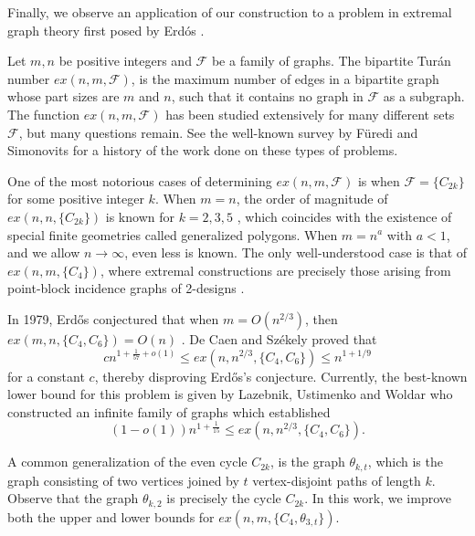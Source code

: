 \documentclass[12pt]{article}
\begin{document}
Finally, we observe an application of our construction to a problem in extremal graph theory first posed by Erd\'{o}s \cite{Erdos1979}.

Let $m, n$ be positive integers and $\mathcal{F}$ be a family of graphs. The bipartite Tur\'{a}n number $ex(n, m, \mathcal{F})$, is the maximum number of edges in a bipartite graph whose part sizes are $m$ and $n$, such that it contains no graph in $\mathcal{F}$ as a subgraph. The function $ex(n, m, \mathcal{F})$ has been studied extensively for many different sets $\mathcal{F}$, but many questions remain. See the well-known survey by F\"{u}redi and Simonovits \cite{FurediSimonovits2013} for a history of the work done on these types of problems.

One of the most notorious cases of determining $ex(n, m, \mathcal{F})$ is when $\mathcal{F} = \{C_{2k}\}$ for some positive integer $k$. When $m = n$, the order of magnitude of $ex(n, n, \{C_{2k} \})$ is known for $k = 2, 3, 5$ \cite{FurediSimonovits2013}, which coincides with the existence of special finite geometries called generalized polygons. When $m = n^a$ with $a < 1$, and we allow $n \rightarrow \infty$, even less is known. The only well-understood case is that of  $ex(n, m, \{C_4\})$, where extremal constructions are precisely those arising from point-block incidence graphs of 2-designs \cite{FurediSimonovits2013}. 
 
 
In 1979, Erd\H{o}s conjectured that when $m = O(n^{2/3})$, then 
$ex(m, n, \{C_4, C_6 \}) = O(n)$ \cite{Erdos1979}. De Caen and Sz\'{e}kely \cite{deCaenSzekely1997} proved that
$$
cn^{1 + \frac{1}{57} + o(1)} \leq ex(n, n^{2/3}, \{C_4, C_6\}) \leq n^{1 + 1/9} 
$$
for a constant $c$, thereby disproving Erd\H{o}s's conjecture.
Currently, the best-known lower bound for this problem is given by Lazebnik, Ustimenko and Woldar \cite{LazebnikUstimenkoWoldar1995} who constructed an infinite family of graphs which established 
$$
(1-o(1))n^{1 + \frac{1}{15}} \leq ex(n, n^{2/3}, \{C_4, C_6\}).
$$


A common generalization of the even cycle $C_{2k}$, is the graph $\theta_{k, t}$, which is the graph consisting of two vertices joined by $t$ vertex-disjoint paths of length $k$. Observe that the graph $\theta_{k, 2}$ is precisely the cycle $C_{2k}$. In this work, we improve both the upper and lower bounds for $ex(n, m, \{ C_4, \theta_{3, t}\})$.
\end{document}
